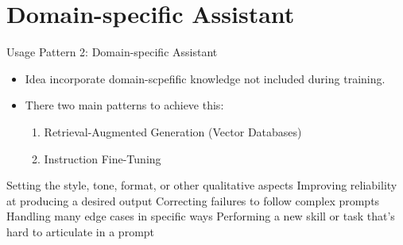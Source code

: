 \documentclass[handout]{beamer}
\begin{document}
\section{Domain-specific Assistant}

\begin{frame}{Usage Pattern 2: Domain-specific Assistant}
\begin{scriptsize}
\begin{itemize}
\item Idea incorporate domain-scpefific knowledge not included during training.
\item There two main patterns to achieve this:
\begin{enumerate}\scriptsize
 \item Retrieval-Augmented Generation (Vector Databases)
 \item Instruction Fine-Tuning
\end{enumerate}
\end{itemize}

    Setting the style, tone, format, or other qualitative aspects
    Improving reliability at producing a desired output
    Correcting failures to follow complex prompts
    Handling many edge cases in specific ways
    Performing a new skill or task that’s hard to articulate in a prompt

\end{scriptsize}
\end{frame}
\end{document}
